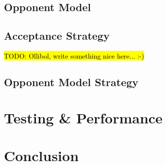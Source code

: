 \documentclass[a4paper,10pt]{article}
\newcommand{\todo}[1] {\hl{TODO: #1}}
\begin{document}
\subsection{Opponent Model}
\label{sec:strategyOM}


\subsection{Acceptance Strategy}
\label{sec:strategyAS}
\todo{Ollibol, write something nice here... :-)}


\clearpage

\subsection{Opponent Model Strategy} 
\label{sec:strategyOMS}


\section{Testing \& Performance}
\label{sec:performance}



\section{Conclusion}
\label{sec:conclusion}




\end{document}

